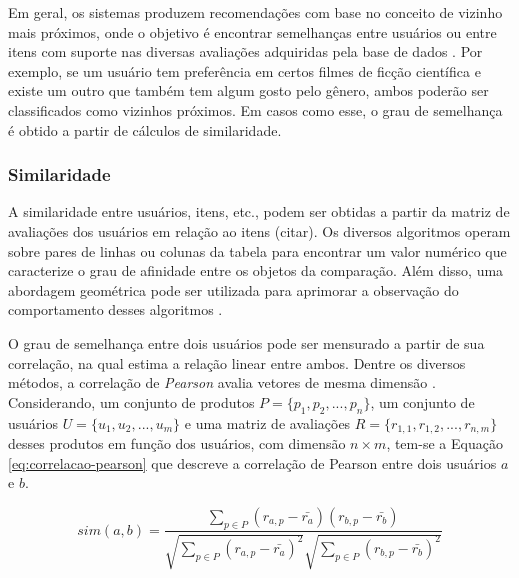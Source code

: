         Em geral, os sistemas produzem recomendações com base no conceito de vizinho mais próximos, onde o objetivo é encontrar semelhanças entre usuários ou entre itens com suporte nas diversas avaliações adquiridas pela base de dados \cite{Mustafa2017}. Por exemplo, se um usuário tem preferência em certos filmes de ficção científica e existe um outro que também tem algum gosto pelo gênero, ambos poderão ser classificados como vizinhos próximos. Em casos como esse, o grau de semelhança é obtido a partir de cálculos de similaridade.
        
        \subsubsection{Similaridade}    
        
        A similaridade entre usuários, itens, etc., podem ser obtidas a partir da matriz de avaliações dos usuários em relação ao itens (citar).  
        Os diversos algoritmos operam sobre pares de linhas ou colunas da tabela para encontrar um valor numérico que caracterize o grau de afinidade entre os objetos da comparação. Além disso, uma abordagem geométrica pode ser utilizada para aprimorar a observação do comportamento desses algoritmos \cite{Jones1987}.
        
        O grau de semelhança entre dois usuários pode ser mensurado a partir de sua correlação, na qual estima a relação linear entre ambos. Dentre os diversos métodos, a correlação de \textit{Pearson} avalia vetores de mesma dimensão \cite{Ricci2010}. Considerando, um conjunto de produtos $P=\{p_1, p_2, ..., p_n\}$, um conjunto de usuários $U = \{u_1, u_2, ..., u_m\}$ e uma matriz de avaliações $R=\{r_{1,1}, r_{1,2}, ..., r_{n, m}\}$ desses produtos em função dos usuários, com dimensão  $n\times m$, tem-se a Equação \ref{eq:correlacao-pearson} que descreve a correlação de Pearson entre dois usuários $a$ e $b$.
             
        \begin{equation}
             sim(a, b) = \frac{\sum_{p\in P}(r_{a, p}-\bar{r_a})(r_{b, p}-\bar{r_b})}{\sqrt{\sum_{p\in P}(r_{a, p}-\bar{r_a})^2}\sqrt{\sum_{p\in P}(r_{b, p}-\bar{r_b})^2}}\label{eq:correlacao-pearson}
        \end{equation}
        
